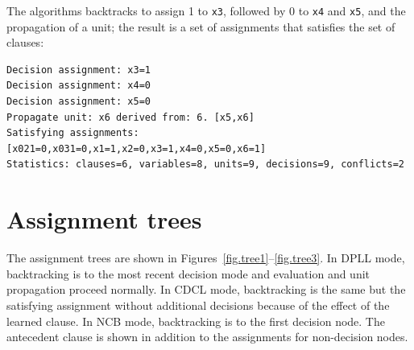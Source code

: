 \documentclass[11pt]{report}
\newcommand*{\p}[1]{\textup{\texttt{#1}}}
\begin{document}
The algorithms backtracks to assign 1 to \p{x3}, followed by 0 to \p{x4}
and \p{x5}, and the propagation of a unit; the result is a set of
assignments that satisfies the set of clauses:
\begin{verbatim}
Decision assignment: x3=1
Decision assignment: x4=0
Decision assignment: x5=0
Propagate unit: x6 derived from: 6. [x5,x6]
Satisfying assignments:
[x021=0,x031=0,x1=1,x2=0,x3=1,x4=0,x5=0,x6=1]
Statistics: clauses=6, variables=8, units=9, decisions=9, conflicts=2
\end{verbatim}

\section{Assignment trees}

The assignment trees are shown in 
Figures~\ref{fig.tree1}--\ref{fig.tree3}. In DPLL mode, backtracking is
to the most recent decision mode and evaluation and unit propagation
proceed normally. In CDCL mode, backtracking is the same but the
satisfying assignment without additional decisions because of the effect
of the learned clause. In NCB mode, backtracking is to the first
decision node. The antecedent clause is shown in addition to the
assignments for non-decision nodes.
\end{document}
